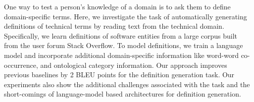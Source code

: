 One way to test a person's knowledge of a domain is to ask them to define domain-specific terms. Here, we investigate the task of automatically generating definitions of technical terms by reading text from the technical domain. Specifically, we learn definitions of software entities from a large corpus built from the user forum Stack Overflow. To model definitions, we train a language model and incorporate additional domain-specific information like word-word co-occurrence, and ontological category information. Our approach improves previous baselines by 2 BLEU points for the definition generation task. Our experiments also show the additional challenges associated with the task and the short-comings of language-model based architectures for definition generation.
